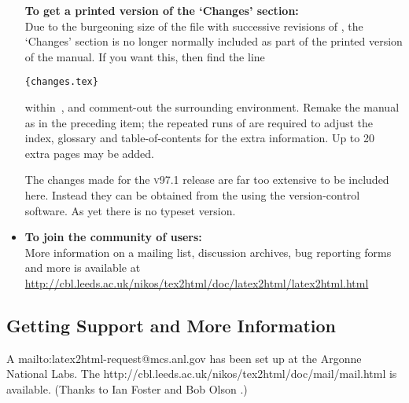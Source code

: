 \begin{itemize}
\begin{changebar}
\textbf{To get a printed version of the `Changes' section: }\\
Due to the burgeoning size of the  file with successive
revisions of \latextohtml, the `Changes' section is no longer
normally included as part of the printed version of the manual.
If you want this, then find the line \html{\smallskip}
\begin{small}
\verb|{changes.tex}| 
\end{small}
\html{\smallskip}
within \,,
and comment-out the surrounding  environment.
Remake the manual as in the preceding item; 
the repeated runs of  are required to adjust the index, 
glossary and table-of-contents for the extra information. 
Up to 20 extra pages may be added.%
\begin{changebar}%
The changes made for the \textsc{v97.1} release are far too extensive
to be included here. Instead they can be obtained from the
%
using the  version-control software.
As yet there is no typeset version.
\end{changebar}\end{changebar}


%
\item 
\textbf{To join the community of \latextohtml{} users:} \\
More information on a mailing list, discussion archives, bug reporting
forms and more is available at 
\url{http://cbl.leeds.ac.uk/nikos/tex2html/doc/latex2html/latex2html.html}
\end{itemize}


\subsection[center]{Getting Support and More Information\label{support}}%
%

A %
{mailto:latex2html-request@mcs.anl.gov} 
has been set up at the Argonne National Labs.  
The %
{http://cbl.leeds.ac.uk/nikos/tex2html/doc/mail/mail.html} is available.
\html{\\}
(Thanks to Ian Foster  
and Bob Olson .)

